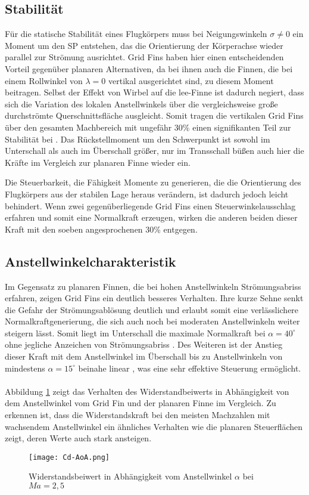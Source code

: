 \subsection{Stabilität}
Für die statische Stabilität eines Flugkörpers muss bei Neigungswinkeln $\sigma \neq 0$ ein Moment um den \gls{SP} entstehen, das die Orientierung der Körperachse wieder parallel zur Strömung ausrichtet. Grid Fins haben hier einen entscheidenden Vorteil gegenüber planaren Alternativen, da bei ihnen auch die Finnen, die bei einem Rollwinkel von $\lambda = 0$ vertikal ausgerichtet sind, zu diesem Moment beitragen. Selbst der Effekt von Wirbel auf die lee-Finne ist dadurch negiert, dass sich die Variation des lokalen Anstellwinkels über die vergleichsweise große durchströmte Querschnittsfläche ausgleicht. Somit tragen die vertikalen Grid Fins über den gesamten Machbereich mit ungefähr 30\% einen signifikanten Teil zur Stabilität bei \cite{vergleichPlanarNATO}. Das Rückstellmoment um den Schwerpunkt ist sowohl im Unterschall als auch im Überschall größer, nur im Transschall büßen auch hier die Kräfte im Vergleich zur planaren Finne wieder ein.

Die Steuerbarkeit, die Fähigkeit Momente zu generieren, die die Orientierung des Flugkörpers aus der stabilen Lage heraus verändern, ist dadurch jedoch leicht behindert. Wenn zwei gegenüberliegende Grid Fins einen Steuerwinkelausschlag erfahren und somit eine Normalkraft erzeugen, wirken die anderen beiden dieser Kraft mit den soeben angesprochenen 30\% entgegen.
\subsection{Anstellwinkelcharakteristik}
Im Gegensatz zu planaren Finnen, die bei hohen Anstellwinkeln Strömungsabriss erfahren, zeigen Grid Fins ein deutlich besseres Verhalten. Ihre kurze Sehne senkt die Gefahr der Strömungsablösung deutlich und erlaubt somit eine verlässlichere Normalkraftgenerierung, die sich auch noch bei moderaten Anstellwinkeln weiter steigern lässt. Somit liegt im Unterschall die maximale Normalkraft bei $\alpha = 40^\circ$ ohne jegliche Anzeichen von Strömungsabriss \cite{synopsis}.
Des Weiteren ist der Anstieg dieser Kraft mit dem Anstellwinkel im Überschall bis zu Anstellwinkeln von mindestens $\alpha=15^\circ$ beinahe linear \cite{synopsis}, was eine sehr effektive Steuerung ermöglicht.\\
~\\
Abbildung \ref{abb_Cd-AoA} zeigt das Verhalten des Widerstandbeiwerts in Abhängigkeit von dem Anstellwinkel vom Grid Fin und der planaren Finne im Vergleich.
Zu erkennen ist, dass die Widerstandskraft bei den meisten Machzahlen mit wachsendem Anstellwinkel ein ähnliches Verhalten wie die planaren Steuerflächen \cite{vergleichPlanarNATO} zeigt, deren Werte auch stark ansteigen.
\begin{figure}[h]
	\centering
	\texttt{[image: Cd-AoA.png]}
	\caption{Widerstandsbeiwert in Abhängigkeit vom Anstellwinkel $\alpha$ bei $Ma=2,5$}
	\label{abb_Cd-AoA}
\end{figure}\\

